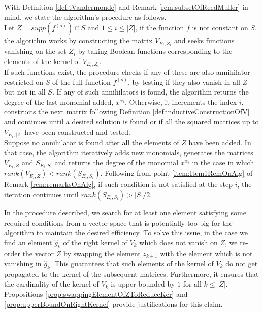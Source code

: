 \documentclass[11pt]{llncs}
\begin{document}
With Definition \ref{def:tVandermonde} and Remark \ref{rem:subsetOfReedMuller} in mind, we state the algorithm's procedure as follows.\\
Let $Z = supp\left(f^{(o)}\right) \cap S$ and $1\leq i \leq |Z|$, if the function $f$ is not constant on $S$, the algorithm works by constructing the matrix $V_{E_i, Z_i}$ and seeks functions vanishing on the set $Z_i$ by taking Boolean functions corresponding to the elements of the kernel of $V_{E_i, Z_i}$.\\
If such functions exist, the procedure checks if any of these are also annihilator restricted on $S$ of the full function $f^{(o)}$, by testing if they also vanish in all $Z$ but not in all $S$. If any of such annihilators is found, the algorithm returns the degree of the last monomial added, $x^{\alpha_i}$. Otherwise, it increments the index $i$, constructs the next matrix following Definition \ref{def:inductiveConstructionOfV} and continues until a desired solution is found or if all the squared matrices up to $V_{E_i, |Z|}$ have been constructed and tested.\\
Suppose no annihilator is found after all the elements of $Z$ have been added. In that case, the algorithm iteratively adds new monomials, generates the matrices $V_{E_i, Z}$ and $S_{E_i, S_i}$ and returns the degree of the monomial $x^{\alpha_i}$ in the case in which $rank\left(V_{E_i, Z}\right) < rank\left(S_{E_i, S_i}\right)$. Following from point \ref{item:Item1RemOnAlg} of Remark \ref{rem:remarksOnAlg}, if such condition is not satisfied at the step $i$, the iteration continues until $rank\left(S_{E_i, S_i}\right) > |S| / 2$.

\begin{remark}
    In the procedure described, we search for at least one element satisfying some required conditions from a vector space that is potentially too big for the algorithm to maintain the desired efficiency. To solve this issue, in the case we find an element $\hat{g}_k$ of the right kernel of $V_k$ which does not vanish on $Z$, we re-order the vector $Z$ by swapping the element $z_{k+1}$ with the element which is not vanishing in $\hat{g}_k$. This guarantees that such elements of the kernel of $V_k$ do not get propagated to the kernel of the subsequent matrices. Furthermore, it ensures that the cardinality of the kernel of $V_k$ is upper-bounded by $1$ for all $k \leq |Z|$.\\
    Propositions \ref{prop:swappingElementOfZToReduceKer} and \ref{prop:upperBoundOnRightKernel} provide justifications for this claim.
\end{remark}
\end{document}
